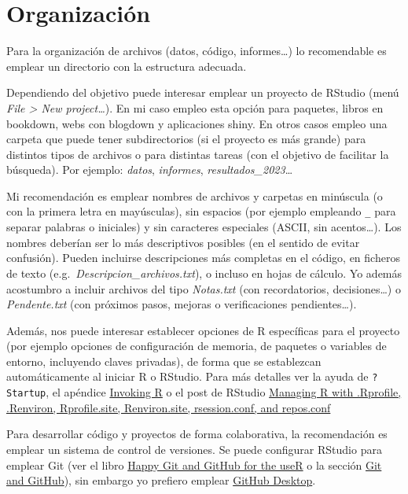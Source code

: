 \documentclass[
]{book}
\theoremstyle{break}
\theoremstyle{nonumberplain}
\begin{document}
\hypertarget{organizacion}{%
\section{Organización}\label{organizacion}}

Para la organización de archivos (datos, código, informes\ldots) lo recomendable es emplear un directorio con la estructura adecuada.

Dependiendo del objetivo puede interesar emplear un proyecto de RStudio (menú \emph{File \textgreater{} New project\ldots{}}).
En mi caso empleo esta opción para paquetes, libros en bookdown, webs con blogdown y aplicaciones shiny.
En otros casos empleo una carpeta que puede tener subdirectorios (si el proyecto es más grande) para distintos tipos de archivos o para distintas tareas (con el objetivo de facilitar la búsqueda).
Por ejemplo: \emph{datos}, \emph{informes}, \emph{resultados\_2023}\ldots{}

Mi recomendación es emplear nombres de archivos y carpetas en minúscula (o con la primera letra en mayúsculas), sin espacios (por ejemplo empleando \texttt{\_} para separar palabras o iniciales) y sin caracteres especiales (ASCII, sin acentos\ldots).
Los nombres deberían ser lo más descriptivos posibles (en el sentido de evitar confusión).
Pueden incluirse descripciones más completas en el código, en ficheros de texto (e.g.~\emph{Descripcion\_archivos.txt}), o incluso en hojas de cálculo.
Yo además acostumbro a incluir archivos del tipo \emph{Notas.txt} (con recordatorios, decisiones\ldots) o \emph{Pendente.txt} (con próximos pasos, mejoras o verificaciones pendientes\ldots).

Además, nos puede interesar establecer opciones de R específicas para el proyecto (por ejemplo opciones de configuración de memoria, de paquetes o variables de entorno, incluyendo claves privadas), de forma que se establezcan automáticamente al iniciar R o RStudio.
Para más detalles ver la ayuda de \texttt{?Startup}, el apéndice \href{https://cran.r-project.org/doc/manuals/r-release/R-intro.html\#Invoking-R}{Invoking R} o el post de RStudio
\href{https://support.posit.co/hc/en-us/articles/360047157094-Managing-R-with-Rprofile-Renviron-Rprofile-site-Renviron-site-rsession-conf-and-repos-conf}{Managing R with .Rprofile, .Renviron, Rprofile.site, Renviron.site, rsession.conf, and repos.conf}

Para desarrollar código y proyectos de forma colaborativa, la recomendación es emplear un sistema de control de versiones.
Se puede configurar RStudio para emplear Git (ver el libro \href{https://happygitwithr.com/index.html}{Happy Git and GitHub for the useR} o la sección \href{https://r-pkgs.org/software-development-practices.html\#sec-sw-dev-practices-git-github}{Git and GitHub}), sin embargo yo prefiero emplear \href{https://desktop.github.com/}{GitHub Desktop}.
\end{document}

